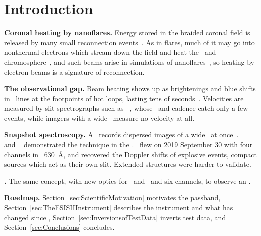 \section{Introduction}%
\label{sec:Introduction}%

\begin{outline}
\item \textbf{Coronal heating by nanoflares.}
    Energy stored in the braided coronal field is released by many small reconnection
    events~\citep{Parker1988}.
    As in flares, much of it may go into nonthermal electrons which stream down the field and heat
    the \TR\ and chromosphere~\citep{Emslie1978}, and such beams arise in simulations of
    nanoflares~\citep{Bakke2018}, so heating by electron beams is a signature of reconnection.
\item \textbf{The observational gap.}
    Beam heating shows up as brightenings and blue shifts in \TR\ lines at the footpoints of hot
    loops, lasting tens of seconds~\citep{Testa2014}.
    Velocities are measured by slit spectrographs such as \IRIS~\citep{DePontieu2014}, whose \FOV\
    and cadence catch only a few events, while imagers with a wide \FOV\ measure no velocity at all.
\item \textbf{Snapshot spectroscopy.}
    A \CTIS\ records dispersed images of a wide \FOV\ at once~\citep{Okamoto1991,Descour1995}.
    \MOSESCapital~\citep{Kankelborg2001,Fox2010} and \ESIS~\citep{Parker2022} demonstrated the technique
    in the \EUV.
    \ESISI\ flew on 2019 September 30 with four channels in \OV\ \SI{630}{\angstrom}, and
    recovered the Doppler shifts of explosive events, compact sources which act as their own slit.
    Extended structures were harder to validate.
\item \textbf{\ESISII.}
    The same concept, with new optics for \NeVII\ and \SiXII\ and six channels, to observe an \AR.
    \roy{Planned launch date and range.}
\item \textbf{Roadmap.}
    Section~\ref{sec:ScientificMotivation} motivates the passband,
    Section~\ref{sec:TheESISIIInstrument} describes the instrument and what has changed since
    \ESISI, Section~\ref{sec:InversionsofTestData} inverts test data, and
    Section~\ref{sec:Conclusions} concludes.
\end{outline}
